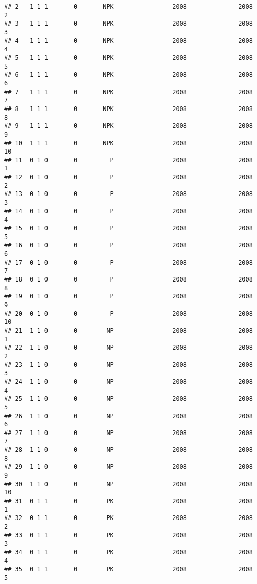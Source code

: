 \documentclass[]{article}
\begin{document}
\begin{verbatim}
## 2   1 1 1       0       NPK                2008              2008        2
## 3   1 1 1       0       NPK                2008              2008        3
## 4   1 1 1       0       NPK                2008              2008        4
## 5   1 1 1       0       NPK                2008              2008        5
## 6   1 1 1       0       NPK                2008              2008        6
## 7   1 1 1       0       NPK                2008              2008        7
## 8   1 1 1       0       NPK                2008              2008        8
## 9   1 1 1       0       NPK                2008              2008        9
## 10  1 1 1       0       NPK                2008              2008       10
## 11  0 1 0       0         P                2008              2008        1
## 12  0 1 0       0         P                2008              2008        2
## 13  0 1 0       0         P                2008              2008        3
## 14  0 1 0       0         P                2008              2008        4
## 15  0 1 0       0         P                2008              2008        5
## 16  0 1 0       0         P                2008              2008        6
## 17  0 1 0       0         P                2008              2008        7
## 18  0 1 0       0         P                2008              2008        8
## 19  0 1 0       0         P                2008              2008        9
## 20  0 1 0       0         P                2008              2008       10
## 21  1 1 0       0        NP                2008              2008        1
## 22  1 1 0       0        NP                2008              2008        2
## 23  1 1 0       0        NP                2008              2008        3
## 24  1 1 0       0        NP                2008              2008        4
## 25  1 1 0       0        NP                2008              2008        5
## 26  1 1 0       0        NP                2008              2008        6
## 27  1 1 0       0        NP                2008              2008        7
## 28  1 1 0       0        NP                2008              2008        8
## 29  1 1 0       0        NP                2008              2008        9
## 30  1 1 0       0        NP                2008              2008       10
## 31  0 1 1       0        PK                2008              2008        1
## 32  0 1 1       0        PK                2008              2008        2
## 33  0 1 1       0        PK                2008              2008        3
## 34  0 1 1       0        PK                2008              2008        4
## 35  0 1 1       0        PK                2008              2008        5

\end{verbatim}
\end{document}

